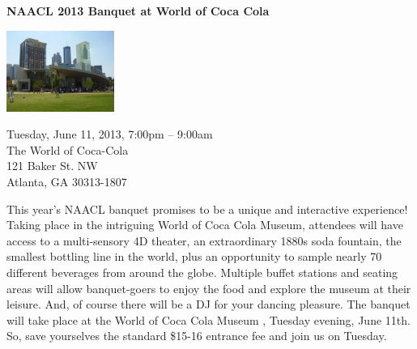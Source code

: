 \begin{center}

\begin{Large}
{\bfseries\Large NAACL 2013 Banquet at World of Coca Cola}\vspace{1em}\par
\end{Large}

\includegraphics[height=100px]{content/day3/cocacola.jpg}

Tuesday, June 11, 2013, 7:00pm -- 9:00am \vspace{1em}\\
The World of Coca-Cola\\
121 Baker St. NW\\
Atlanta, GA 30313-1807\\
\end{center}

\noindent
This year's NAACL banquet promises to be a unique and interactive experience! Taking place in the intriguing World of Coca Cola Museum, attendees will have access to a multi-sensory 4D theater, an extraordinary 1880s soda fountain, the smallest bottling line in the world, plus an opportunity to sample nearly 70 different beverages from around the globe. Multiple buffet stations and seating areas will allow banquet-goers to enjoy the food and explore the museum at their leisure. And, of course there will be a DJ for your dancing pleasure. The banquet will take place at the World of Coca Cola Museum , Tuesday evening, June 11th. So, save yourselves the standard \$15-16 entrance fee and join us on Tuesday.


\newpage
